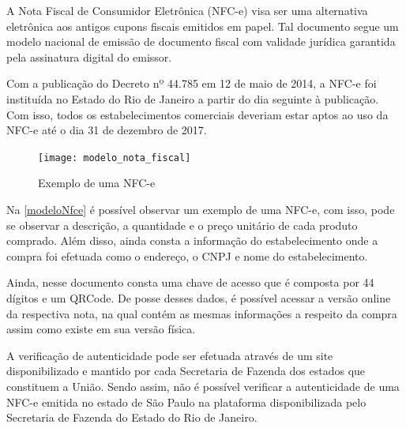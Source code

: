 A Nota Fiscal de Consumidor Eletrônica (NFC-e) visa ser uma alternativa eletrônica aos antigos cupons fiscais emitidos em papel. Tal documento segue um modelo nacional de emissão de documento fiscal com validade jurídica garantida pela assinatura digital do emissor.

Com a publicação do Decreto nº 44.785 em 12 de maio de 2014, a NFC-e foi instituída no Estado do Rio de Janeiro a partir do dia seguinte à publicação. Com isso, todos os estabelecimentos comerciais deveriam estar aptos ao uso da NFC-e até o dia 31 de dezembro de 2017.

\begin{figure}[h]
    \centering
    \texttt{[image: modelo\_nota\_fiscal]}
    \caption{Exemplo de uma NFC-e}
    \label{modeloNfce}
\end{figure}

Na \autoref{modeloNfce} é possível observar um exemplo de uma NFC-e, com isso, pode se observar a descrição, a quantidade e o preço unitário de cada produto comprado. Além disso, ainda consta a informação do estabelecimento onde a compra foi efetuada como o endereço, o CNPJ e nome do estabelecimento.

Ainda, nesse documento consta uma chave de acesso que é composta por 44 dígitos e um QRCode. De posse desses dados, é possível acessar a versão online da respectiva nota, na qual contém as mesmas informações a respeito da compra assim como existe em sua versão física.


A verificação de autenticidade pode ser efetuada através de um site disponibilizado e mantido por cada Secretaria de Fazenda dos estados que constituem a União. Sendo assim, não é possível verificar a autenticidade de uma NFC-e emitida no estado de São Paulo na plataforma disponibilizada pelo Secretaria de Fazenda do Estado do Rio de Janeiro.